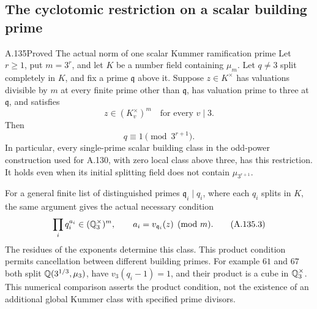 \subsection{The cyclotomic restriction on a scalar building prime}

\begin{statement}{A.135}{Proved}
{The actual norm of one scalar Kummer ramification prime}
Let \(r\ge1\), put \(m=3^r\), and let \(K\) be a
number field containing \(\mu_m\).
Let \(q\ne3\) split completely in \(K\), and fix a
prime \(\mathfrak q\) above it.
Suppose \(z\in K^\times\) has valuations divisible
by \(m\) at every finite prime other than
\(\mathfrak q\), has valuation prime to three at
\(\mathfrak q\), and satisfies
\[
                        z\in(K_v^\times)^m
                                    \quad\text{for every }v\mid3.
 \tag{A.135.1}
\]
Then
\[
                          q\equiv1\pmod{3^{r+1}}.
 \tag{A.135.2}
\]
In particular, every single-prime scalar building
class in the odd-power construction used for A.130,
with zero local class above three, has this restriction.
It holds even when its initial splitting field does
not contain \(\mu_{3^{r+1}}\).

For a general finite list of distinguished primes
\(\mathfrak q_i\mid q_i\), where each \(q_i\) splits
in \(K\), the same argument gives the actual
necessary condition
\[
              \prod_iq_i^{a_i}\in(\mathbb Q_3^\times)^m,
                  \qquad a_i=v_{\mathfrak q_i}(z)\pmod m.
 \tag{A.135.3}
\]
The residues of the exponents determine this class.
This product condition permits cancellation between
different building primes.  For example \(61\) and
\(67\) both split \(\mathbb Q(3^{1/3},\mu_3)\), have
\(v_3(q_i-1)=1\), and their product is a cube in
\(\mathbb Q_3^\times\).
This numerical comparison asserts the product
condition, not the existence of an additional
global Kummer class with specified prime divisors.
\end{statement}

